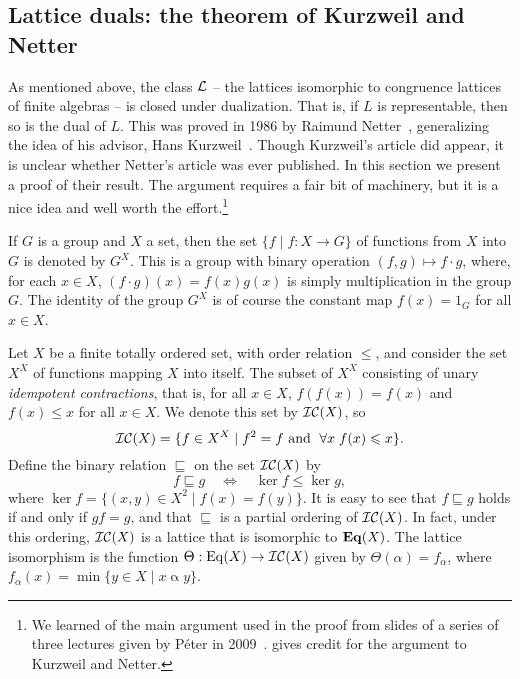 \subsection{Lattice duals: the theorem of Kurzweil and Netter}
\label{sec:duals-interv-subl-detail}
As mentioned above, 
the class $\mathcal{L}$ -- the lattices isomorphic to congruence lattices of finite
algebras -- is closed under
dualization.
That is, if $L$ is representable, then so is the dual of $L$. This was proved in
1986 by Raimund Netter~\cite{Netter:1986}, generalizing the idea of his advisor,
Hans Kurzweil~\cite{Kurzweil:1985}. 
Though Kurzweil's article did appear,
it is unclear whether Netter's
article was ever published.
In this section we present a proof of their result.
The argument requires a fair bit of machinery, but it is a nice idea and
well worth the effort.\footnote{We learned 
  of the main argument used in the proof from slides of a series of three
  lectures given by P{\'e}ter \Palfy in 2009~\cite{Palfy:2009}.
  \Palfy gives credit for the argument to Kurzweil and Netter.} 

If $G$ is a group and $X$ a set, then the set $\{f \mid f:X\rightarrow G\}$ of 
functions from $X$ into $G$ is denoted by $G^X$.  This is a group with binary
operation $(f,g) \mapsto f\cdot g$, where,  
for each $x\in X$, $(f\cdot g)(x)= f(x)g(x)$ is simply multiplication
in the group $G$.  The identity of the group $G^X$ is of course the constant map $f(x) =
1_G$ for all $x\in X$.

Let $X$ be a finite totally ordered set, with order relation $\leq$,
and consider the set $X^X$ of functions mapping $X$ into itself.  
The subset of $X^X$ consisting of unary
\emph{idempotent contractions}, that is, for all $x\in X$,
$f(f(x)) = f(x)$ and $f(x) \leq x$ for all $x\in X$. 
We denote this set by $\mathcal{IC}(X)$, so
\[
\mathcal{IC}(X) = \{f\in X^X \mid f^2 = f \text{ and }\; \forall x\; f(x) \leqslant x\}.
\]
Define the binary relation $\sqsubseteq$ on the set $\mathcal{IC}(X)$ by
\begin{equation}
  \label{eq:MID111}
  f\sqsubseteq g \quad \Leftrightarrow \quad \ker f \leq \ker g,
\end{equation}
where $\ker f = \{(x,y) \in X^2 \mid f(x) = f(y)\}$.
It is easy to see that $f\sqsubseteq g$ holds if and only if $gf = g$, and that
$\sqsubseteq$ is a partial ordering of $\mathcal{IC}(X)$.  
In fact, under this ordering, $\mathcal{IC}(X)$ is a lattice that is
isomorphic to $\mathbf{Eq}(X)$. The lattice isomorphism is the function
$\Theta : \operatorname{Eq}(X) \rightarrow \mathcal{IC}(X)$ given by
$\Theta(\alpha) = f_\alpha$, where
$f_\alpha(x) = \min\{y\in X \mid x \mathrel{\alpha} y\}$.



